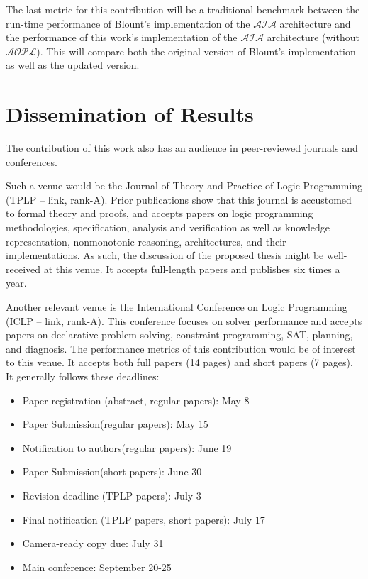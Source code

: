 The last metric for this contribution will be a traditional benchmark between the run-time performance of Blount's implementation of the $\mathcal{AIA}$ architecture and the performance of this work's implementation of the $\mathcal{AIA}$ architecture (without $\mathcal{AOPL}$).
This will compare both the original version of Blount's implementation as well as the updated version.

\section{Dissemination of Results}

The contribution of this work also has an audience in peer-reviewed journals and conferences.

Such a venue would be the Journal of Theory and Practice of Logic Programming (TPLP – link, rank-A).
Prior publications show that this journal is accustomed to formal theory and proofs, and accepts papers on logic programming methodologies, specification, analysis and verification as well as knowledge representation, nonmonotonic reasoning, architectures, and their implementations.
As such, the discussion of the proposed thesis might be well-received at this venue.
It accepts full-length papers and publishes six times a year.

Another relevant venue is the International Conference on Logic Programming (ICLP – link, rank-A).
This conference focuses on solver performance and accepts papers on declarative problem solving, constraint programming, SAT, planning, and diagnosis.
The performance metrics of this contribution would be of interest to this venue.
It accepts both full papers (14 pages) and short papers (7 pages).
It generally follows these deadlines:

\begin{itemize}
    \item Paper registration (abstract, regular papers): May 8
    \item Paper Submission(regular papers): May 15
    \item Notification to authors(regular papers): June 19
    \item Paper Submission(short papers): June 30
    \item Revision deadline (TPLP papers): July 3
    \item Final notification (TPLP papers, short papers): July 17
    \item Camera-ready copy due: July 31
    \item Main conference: September 20-25
\end{itemize}

